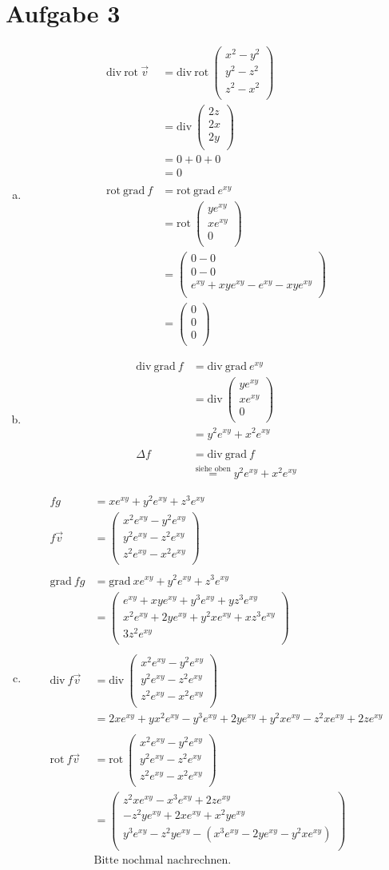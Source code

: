 \documentclass[10pt,a4paper,parskip=half]{scrartcl}
\newcommand{\vecthree}[3]{\begin{pmatrix}#1\\#2\\#3\\\end {pmatrix}}
\begin{document}
\section*{Aufgabe 3}
\begin{enumerate}[(a)]
\item
\begin{align*}
\text{div}\ \text{rot}\ \vec v &= \text{div}\ \text{rot}\ \vecthree{x^2 - y^2}{y^2 -z^2}{z^2 - x^2}\\
&= \text{div}\ \vecthree{2z}{2x}{2y}\\
&= 0 + 0 + 0 \\
&= 0\\
\\
\text{rot}\ \text{grad}\ f &= \text{rot}\ \text{grad}\ e^{xy} \\
&= \text{rot}\ \vecthree{ye^{xy}}{xe^{xy}}{0} \\
&= \vecthree{0 -0}{0-0}{e^{xy} + xye^{xy} - e^{xy} - xye^{xy}} \\
&= \vecthree{0}{0}{0}
\end{align*}
\item
\begin{align*}
\text{div}\ \text{grad}\ f &= \text{div}\ \text{grad}\ e^{xy}\\
&= \text{div}\ \vecthree{ye^{xy}}{xe^{xy}}{0}\\
&= y^2e^{xy} + x^2e^{xy}\\
\\
\Delta f &= \text{div}\ \text{grad}\ f\\
&\overset{\text{siehe oben}}{=} y^2e^{xy} + x^2e^{xy}
\end{align*}
\item
\begin{align*}
fg &= xe^{xy} + y^2e^{xy} + z^3e^{xy} \\
f \vec v &= \vecthree{x^2e^{xy}-y^2e^{xy}}{y^2e^{xy}-z^2e^{xy}}{z^2e^{xy}-x^2e^{xy}} \\
\\
\text{grad}\ fg &= \text{grad}\ xe^{xy} + y^2e^{xy} + z^3e^{xy} \\
&= \vecthree{e^{xy} + xye^{xy} + y^3e^{xy} + yz^3e^{xy}}{x^2e^{xy} + 2ye^{xy} + y^2xe^{xy} + xz^3e^{xy}}{3z^2e^{xy}}\\
\\
\text{div}\ f\vec v &= \text{div}\ \vecthree{x^2e^{xy}-y^2e^{xy}}{y^2e^{xy}-z^2e^{xy}}{z^2e^{xy}-x^2e^{xy}}\\
&= 2xe^{xy} + yx^2e^{xy} - y^3e^{xy} + 2ye^{xy} + y^2xe^{xy} - z^2xe^{xy} + 2ze^{xy}\\
\\
\text{rot}\ f\vec v &= \text{rot}\ \vecthree{x^2e^{xy}-y^2e^{xy}}{y^2e^{xy}-z^2e^{xy}}{z^2e^{xy}-x^2e^{xy}}\\
&= \vecthree{z^2xe^{xy} - x^3e^{xy} + 2ze^{xy}}{-z^2ye^{xy} + 2xe^{xy} + x^2ye^{xy}}{y^3e^{xy} - z^2ye^{xy} - (x^3e^{xy} - 2ye^{xy} - y^2xe^{xy})}\\
&\text{Bitte nochmal nachrechnen.}
\end{align*}
\end{enumerate}
\end{document}
